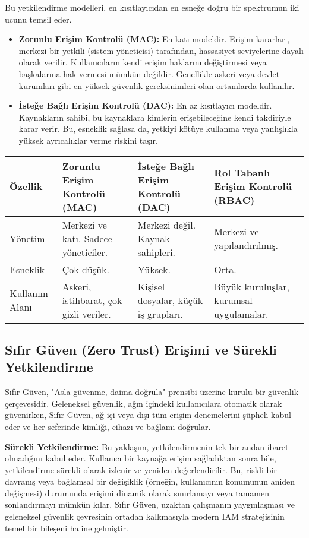Bu yetkilendirme modelleri, en kısıtlayıcıdan en esneğe doğru bir spektrumun iki ucunu temsil eder.

\begin{itemize}
    \item \textbf{Zorunlu Erişim Kontrolü (MAC):} En katı modeldir. Erişim kararları, merkezi bir yetkili (sistem yöneticisi) tarafından, hassasiyet seviyelerine dayalı olarak verilir. Kullanıcıların kendi erişim haklarını değiştirmesi veya başkalarına hak vermesi mümkün değildir. Genellikle askeri veya devlet kurumları gibi en yüksek güvenlik gereksinimleri olan ortamlarda kullanılır.
    \item \textbf{İsteğe Bağlı Erişim Kontrolü (DAC):} En az kısıtlayıcı modeldir. Kaynakların sahibi, bu kaynaklara kimlerin erişebileceğine kendi takdiriyle karar verir. Bu, esneklik sağlasa da, yetkiyi kötüye kullanma veya yanlışlıkla yüksek ayrıcalıklar verme riskini taşır.
\end{itemize}

\begin{tabularx}{\textwidth}{|l|X|X|X|}
\hline
\textbf{Özellik} & \textbf{Zorunlu Erişim Kontrolü (MAC)} & \textbf{İsteğe Bağlı Erişim Kontrolü (DAC)} & \textbf{Rol Tabanlı Erişim Kontrolü (RBAC)} \\
\hline
Yönetim & Merkezi ve katı. Sadece yöneticiler. & Merkezi değil. Kaynak sahipleri. & Merkezi ve yapılandırılmış. \\
\hline
Esneklik & Çok düşük. & Yüksek. & Orta. \\
\hline
Kullanım Alanı & Askeri, istihbarat, çok gizli veriler. & Kişisel dosyalar, küçük iş grupları. & Büyük kuruluşlar, kurumsal uygulamalar. \\
\hline
\end{tabularx}

\subsection{Sıfır Güven (Zero Trust) Erişimi ve Sürekli Yetkilendirme}

Sıfır Güven, "Asla güvenme, daima doğrula" prensibi üzerine kurulu bir güvenlik çerçevesidir. Geleneksel güvenlik, ağın içindeki kullanıcılara otomatik olarak güvenirken, Sıfır Güven, ağ içi veya dışı tüm erişim denemelerini şüpheli kabul eder ve her seferinde kimliği, cihazı ve bağlamı doğrular.

\textbf{Sürekli Yetkilendirme:} Bu yaklaşım, yetkilendirmenin tek bir andan ibaret olmadığını kabul eder. Kullanıcı bir kaynağa erişim sağladıktan sonra bile, yetkilendirme sürekli olarak izlenir ve yeniden değerlendirilir. Bu, riskli bir davranış veya bağlamsal bir değişiklik (örneğin, kullanıcının konumunun aniden değişmesi) durumunda erişimi dinamik olarak sınırlamayı veya tamamen sonlandırmayı mümkün kılar. Sıfır Güven, uzaktan çalışmanın yaygınlaşması ve geleneksel güvenlik çevresinin ortadan kalkmasıyla modern IAM stratejisinin temel bir bileşeni haline gelmiştir.

